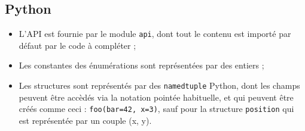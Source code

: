 \subsection{Python}

\begin{itemize}
\item{L'API est fournie par le module \texttt{api}, dont tout le contenu est
      importé par défaut par le code à compléter ;}
\item{Les constantes des énumérations sont représentées par des entiers ;}
\item{Les structures sont représentés par des \texttt{namedtuple} Python, dont
      les champs peuvent être accèdés via la notation pointée habituelle, et
      qui peuvent être créés comme ceci : \texttt{foo(bar=42, x=3)}, sauf pour
      la structure \texttt{position} qui est représentée par un couple (x, y).}
\end{itemize}
